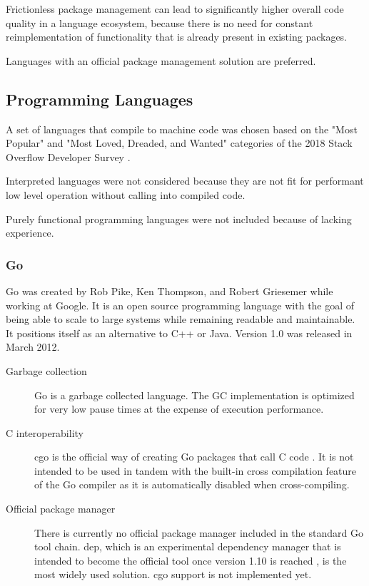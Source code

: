 Frictionless package management can lead to significantly higher overall code quality in a language ecosystem, because there is no need for constant reimplementation of functionality that is already present in existing packages. 

Languages with an official package management solution are preferred.

\subsection{Programming Languages} 
A set of languages that compile to machine code was chosen based on the "Most Popular" and "Most Loved, Dreaded, and Wanted" categories of the 2018 Stack Overflow Developer Survey \cite{stackoverflow-survey}.

Interpreted languages were not considered because they are not fit for performant low level operation without calling into compiled code.

Purely functional programming languages were not included because of lacking experience.

\subsubsection{Go}
Go was created by Rob Pike, Ken Thompson, and Robert Griesemer while working at Google. It is an open source programming language with the goal of being able to scale to large systems while remaining readable and maintainable. It positions itself as an alternative to C++ or Java. 
Version 1.0 was released in March 2012.
\begin{description} 
\item [Garbage collection]
Go is a garbage collected language. The GC implementation is optimized for very low pause times at the expense of execution performance. 
\item [C interoperability]
cgo is the official way of creating Go packages that call C code \cite{cgo-docs}. It is not intended to be used in tandem with the built-in cross compilation feature of the Go compiler as it is automatically disabled when cross-compiling.
\item [Official package manager]
There is currently no official package manager included in the standard Go tool chain. dep, which is an experimental dependency manager that is intended to become the official tool once version 1.10 is reached \cite{dep-roadmap}, is the most widely used solution. cgo support \cite{dep-cgo} is not implemented yet.
\end{description}

